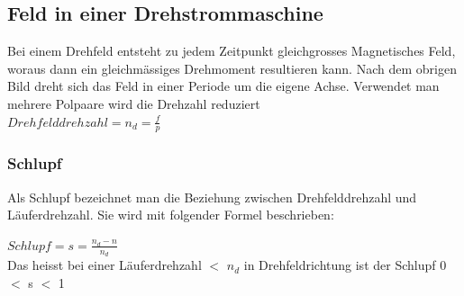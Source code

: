     \subsection{Feld in einer Drehstrommaschine}
        \begin{minipage}{7cm}
        \end{minipage}
        \begin{minipage}{11cm}
            Bei einem Drehfeld entsteht zu jedem Zeitpunkt gleichgrosses Magnetisches Feld, woraus dann ein gleichmässiges Drehmoment resultieren kann. Nach dem obrigen Bild dreht sich das Feld in einer Periode um die eigene Achse. Verwendet man mehrere Polpaare wird die Drehzahl reduziert \\
            $Drehfelddrehzahl  = n_d =\frac{f}{p}$ \\
        \end{minipage}

    \subsubsection{Schlupf}
        Als Schlupf bezeichnet man die Beziehung zwischen Drehfelddrehzahl und Läuferdrehzahl. Sie wird mit folgender Formel beschrieben: \\
        \begin{minipage}{8cm}
            $Schlupf = s = \frac{n_d - n}{n_d}$ \\
            Das heisst bei einer Läuferdrehzahl $<$ $n_d$ in Drehfeldrichtung ist der Schlupf 0 $<$ s $<$ 1
        \end{minipage}
        \begin{minipage}{9cm}
        \end{minipage}
    \newpage